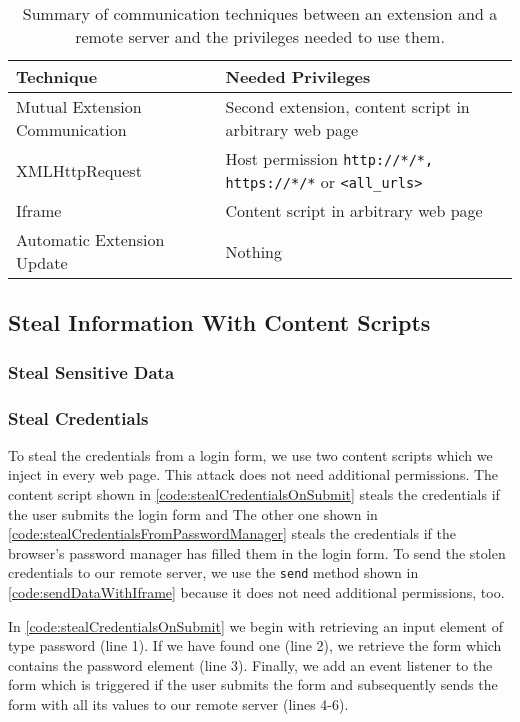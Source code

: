 	\begin{table}[h]
		\centering
		\begin{tabular}{|l|l|} \hline
			\textbf{Technique} & \textbf{Needed Privileges} \\ \hline
			Mutual Extension Communication & Second extension, content script in arbitrary web page \\
			XMLHttpRequest & Host permission \texttt{http://*/*, https://*/*} or \texttt{<all\_urls>} \\
			Iframe & Content script in arbitrary web page \\
			Automatic Extension Update & Nothing \\ 
			\hline
		\end{tabular}
		\caption{Summary of communication techniques between an extension and a remote server and the privileges needed to use them.}
		\label{tab:summaryRemoteCommunication}
	\end{table}



	

\subsection{Steal Information With Content Scripts}

\subsubsection{Steal Sensitive Data}

\subsubsection{Steal Credentials}
	
	To steal the credentials from a login form, we use two content scripts which we inject in every web page. This attack does not need additional permissions. The content script shown in \autoref{code:stealCredentialsOnSubmit} steals the credentials if the user submits the login form and The other one shown in \autoref{code:stealCredentialsFromPasswordManager} steals the credentials if the browser's password manager has filled them in the login form. To send the stolen credentials to our remote server, we use the \texttt{send} method shown in \autoref{code:sendDataWithIframe} because it does not need additional permissions, too. 
	
	In \autoref{code:stealCredentialsOnSubmit} we begin with retrieving an input element of type password (line 1). If we have found one (line 2), we retrieve the form which contains the password element (line 3). Finally, we add an event listener to the form which is triggered if the user submits the form and subsequently sends the form with all its values to our remote server (lines 4-6). 
	
